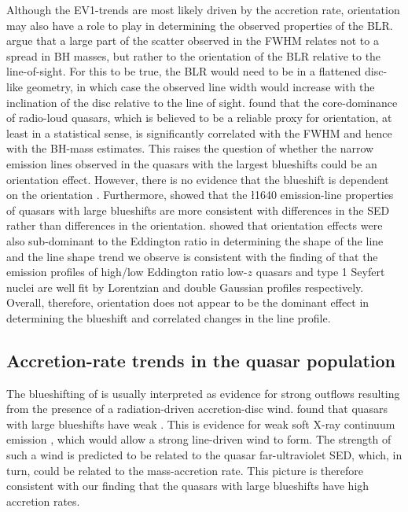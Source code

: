 Although the EV1-trends \citep{sulentic00b,shen14} are most likely driven by the accretion rate, orientation may also have a role to play in determining the observed properties of the BLR. 
\citet{shen14} argue that a large part of the scatter observed in the \hb FWHM relates not to a spread in BH masses, but rather to the orientation of the BLR relative to the line-of-sight.
For this to be true, the BLR would need to be in a flattened disc-like geometry, in which case the observed line width would increase with the inclination of the disc relative to the line of sight. 
\citet{brotherton15b} found that the core-dominance of radio-loud quasars, which is believed to be a reliable proxy for orientation, at least in a statistical sense, is significantly correlated with the \hb FWHM and hence with the BH-mass estimates. 
This raises the question of whether the narrow \ha emission lines observed in the quasars with the largest  blueshifts could be an orientation effect. 
However, there is no evidence that the  blueshift is dependent on the orientation \citep[inferred from the radio core-dominance;][]{richards11,runnoe14}. 
Furthermore, \citet{leighly04} showed that the \l1640 emission-line properties of quasars with large  blueshifts are more consistent with differences in the SED rather than differences in the orientation.
\citet{collin06} showed that orientation effects were also sub-dominant to the Eddington ratio in determining the shape of the \hb line and
the \ha line shape trend we observe is consistent with the finding of \citet{marziani03} that the \hb emission profiles of high/low Eddington ratio low-$z$ quasars and type 1 Seyfert nuclei are well fit by Lorentzian and double Gaussian profiles respectively.  
Overall, therefore, orientation does not appear to be the dominant effect in determining the  blueshift and correlated changes in the \ha line profile. 

\subsection{Accretion-rate trends in the quasar population}

The blueshifting of  is usually interpreted as evidence for strong outflows resulting from the presence of a radiation-driven accretion-disc wind. 
\citet{richards02} found that quasars with large  blueshifts have weak .
This is evidence for weak soft X-ray continuum emission \citep{leighly04}, which would allow a strong line-driven wind to form.  
The strength of such a wind is predicted to be related to the quasar far-ultraviolet SED, which, in turn, could be related to the mass-accretion rate.
This picture is therefore consistent with our finding that the quasars with large  blueshifts have high accretion rates. 

